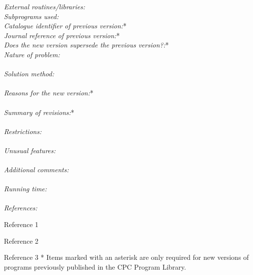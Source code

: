 \documentclass{elsart}
\newcounter{bla}
\newenvironment{refnummer}{%
\list{[\arabic{bla}]}%
{\usecounter{bla}%
 \setlength{\itemindent}{0pt}%
 \setlength{\topsep}{0pt}%
 \setlength{\itemsep}{0pt}%
 \setlength{\labelsep}{2pt}%
 \setlength{\listparindent}{0pt}%
 \settowidth{\labelwidth}{[9]}%
 \setlength{\leftmargin}{\labelwidth}%
 \addtolength{\leftmargin}{\labelsep}%
 \setlength{\rightmargin}{0pt}}}
 {\endlist}
\begin{document}
\begin{small}
{\em External routines/libraries:}                                      \\
{\em Subprograms used:}                                       \\
{\em Catalogue identifier of previous version:}*              \\
{\em Journal reference of previous version:}*                  \\
{\em Does the new version supersede the previous version?:}*   \\

{\em Nature of problem:}\\
   \\
{\em Solution method:}\\
   \\
{\em Reasons for the new version:}*\\
   \\
{\em Summary of revisions:}*\\
   \\
{\em Restrictions:}\\
   \\
{\em Unusual features:}\\
   \\
{\em Additional comments:}\\
   \\
{\em Running time:}\\
   \\
{\em References:}
\begin{refnummer}
\item Reference 1         %
\item Reference 2         %
\item Reference 3         %
\end{refnummer}
* Items marked with an asterisk are only required for new versions
of programs previously published in the CPC Program Library.\\
\end{small}
\end{document}
